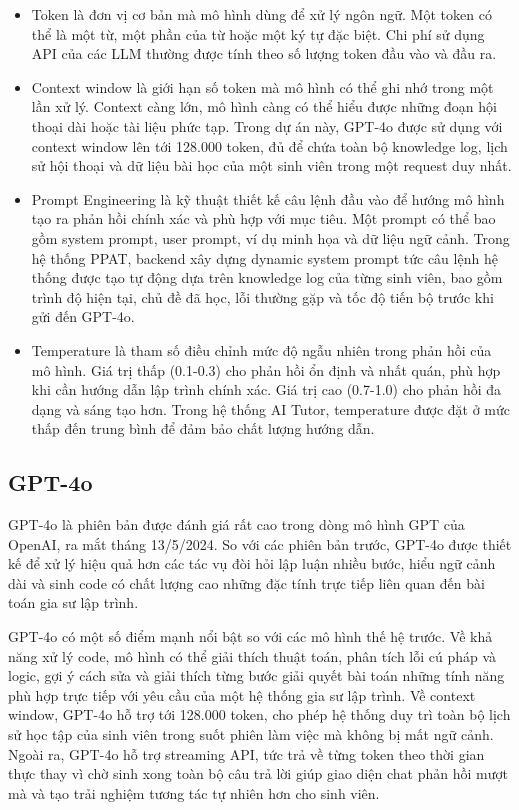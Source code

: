 \documentclass[../main.tex]{subfiles}
\begin{document}
\begin{itemize}
    \item Token là đơn vị cơ bản mà mô hình dùng để xử lý ngôn ngữ. Một token có thể là một từ, một phần của từ hoặc một ký tự đặc biệt. Chi phí sử dụng API của các LLM thường được tính theo số lượng token đầu vào và đầu ra.
    \item Context window là giới hạn số token mà mô hình có thể ghi nhớ trong một lần xử lý. Context càng lớn, mô hình càng có thể hiểu được những đoạn hội thoại dài hoặc tài liệu phức tạp. Trong dự án này, GPT-4o được sử dụng với context window lên tới 128.000 token, đủ để chứa toàn bộ knowledge log, lịch sử hội thoại và dữ liệu bài học của một sinh viên trong một request duy nhất.
    \item Prompt Engineering là kỹ thuật thiết kế câu lệnh đầu vào để hướng mô hình tạo ra phản hồi chính xác và phù hợp với mục tiêu. Một prompt có thể bao gồm system prompt, user prompt, ví dụ minh họa và dữ liệu ngữ cảnh. Trong hệ thống PPAT, backend xây dựng dynamic system prompt tức câu lệnh hệ thống được tạo tự động dựa trên knowledge log của từng sinh viên, bao gồm trình độ hiện tại, chủ đề đã học, lỗi thường gặp và tốc độ tiến bộ trước khi gửi đến GPT-4o.
    \item Temperature là tham số điều chỉnh mức độ ngẫu nhiên trong phản hồi của mô hình. Giá trị thấp (0.1-0.3) cho phản hồi ổn định và nhất quán, phù hợp khi cần hướng dẫn lập trình chính xác. Giá trị cao (0.7-1.0) cho phản hồi đa dạng và sáng tạo hơn. Trong hệ thống AI Tutor, temperature được đặt ở mức thấp đến trung bình để đảm bảo chất lượng hướng dẫn.
\end{itemize}

\subsection{GPT-4o}

GPT-4o là phiên bản được đánh giá rất cao trong dòng mô hình GPT của OpenAI, ra mắt tháng 13/5/2024. So với các phiên bản trước, GPT-4o được thiết kế để xử lý hiệu quả hơn các tác vụ đòi hỏi lập luận nhiều bước, hiểu ngữ cảnh dài và sinh code có chất lượng cao những đặc tính trực tiếp liên quan đến bài toán gia sư lập trình.

GPT-4o có một số điểm mạnh nổi bật so với các mô hình thế hệ trước. Về khả năng xử lý code, mô hình có thể giải thích thuật toán, phân tích lỗi cú pháp và logic, gợi ý cách sửa và giải thích từng bước giải quyết bài toán những tính năng phù hợp trực tiếp với yêu cầu của một hệ thống gia sư lập trình. Về context window, GPT-4o hỗ trợ tới 128.000 token, cho phép hệ thống duy trì toàn bộ lịch sử học tập của sinh viên trong suốt phiên làm việc mà không bị mất ngữ cảnh. Ngoài ra, GPT-4o hỗ trợ streaming API, tức trả về từng token theo thời gian thực thay vì chờ sinh xong toàn bộ câu trả lời giúp giao diện chat phản hồi mượt mà và tạo trải nghiệm tương tác tự nhiên hơn cho sinh viên.
\end{document}
